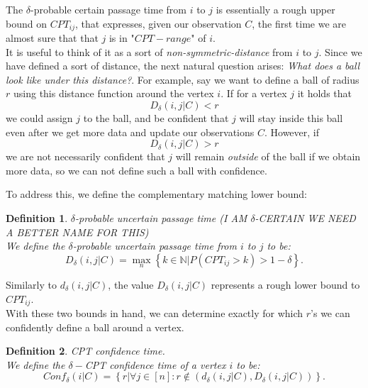 \documentclass{article}
\newtheorem{definition}{Definition}
\begin{document}
The $\delta$-probable certain passage time from $i$ to $j$ is essentially a rough upper bound on $CPT_{ij}$, that expresses, given our observation $C$, the first time we are almost sure that that $j$ is in "$CPT-range$" of $i$. \\
It is useful to think of it as a sort of \textit{non-symmetric-distance} from $i$ to $j$.
Since we have defined a sort of distance, the next natural question arises: \textit{What does a ball look like under this distance?}.
For example, say we want to define a ball of radius $r$ using this distance function around the vertex $i$. If for a vertex $j$ it holds that 
\[
D_{\delta}(i,j|C) < r
\] 
we could assign $j$ to the ball, and be confident that $j$ will stay inside this ball even after we get more data and update our observations $C$. However, if 
\[
D_{\delta}(i,j|C) > r
\] 
we are not necessarily confident that $j$ will remain \textit{outside} of the ball if we obtain more data, so we can not define such a ball with confidence.

To address this, we define the complementary matching lower bound:
\begin{definition}
    $\delta$-probable uncertain passage time (I AM $\delta$-CERTAIN WE NEED A BETTER NAME FOR THIS) \\
    We define the $\delta$-probable uncertain passage time from $i$ to $j$ to be:
    \[
    D_{\delta}(i,j|C) = \max_n \left\{k \in \mathbb{N} |P(CPT_{ij} > k) > 1-\delta  \right\}
    .\] 
\end{definition}
Similarly to $d_{\delta}(i,j|C)$, the value $D_{\delta}(i,j|C)$ represents a rough lower bound to $CPT_{ij}$.\\
With these two bounds in hand, we can determine exactly for which $r$'s we can confidently define a ball around a vertex.

 \begin{definition}
     CPT confidence time. \\
     We define the $\delta-$CPT confidence time of a vertex $i$ to be:
      \[
          Conf_\delta(i|C) = \left\{ r | \forall j\in [n] : r \notin \left(d_{\delta}\left(i,j|C\right) , D_{\delta}(i,j|C)\right)\right\}
     .\] 
\end{definition}
\end{document}
